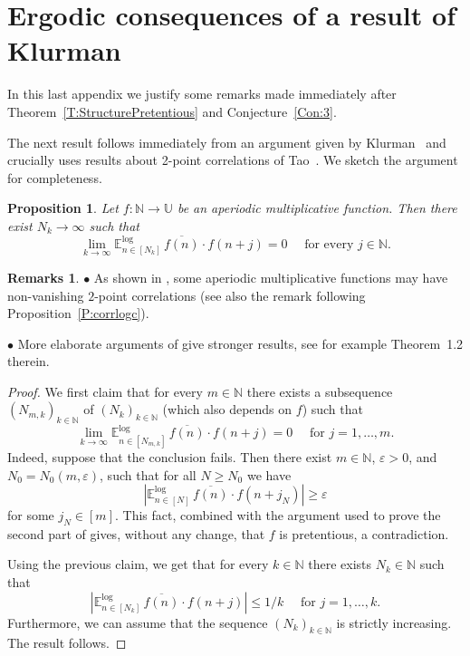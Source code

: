 \documentclass[11pt]{amsart}
\newtheorem{proposition}[lemma]{Proposition}
\theoremstyle{definition}
\newtheorem*{remarks}{Remarks}
\newcommand{\lE}{\mathbb{E}^{\log}}
\newcommand{\N}{{\mathbb N}}
\newcommand{\U}{{\mathbb U}}
\begin{document}
\section{Ergodic consequences of a result of Klurman}\label{A:Klurman}
In this last  appendix we justify some remarks made immediately after Theorem~\ref{T:StructurePretentious} and Conjecture~\ref{Con:3}.

 The next  result
follows immediately from an argument given by Klurman~ \cite{Kl17}
and  crucially uses results  about 2-point correlations of  Tao~\cite{Tao15}. We sketch the argument for completeness.
\begin{proposition}{\cite[Proof of Lemma~4.3]{Kl17}}\label{P:Klurman}
	Let $f\colon \N\to \U$ be an aperiodic multiplicative function. Then  there exist
$N_k\to\infty$ such that
\begin{equation}\label{E:Klurman}
	\lim_{k\to \infty} \lE_{n\in [N_{k}]} \, \overline{f(n)}\cdot f(n+j)=0 \quad \text{ for every } j\in \N.
\end{equation}
\end{proposition}
\begin{remarks}
		$\bullet$
	As shown in \cite[Theorem~B.1]{MRT15},  some aperiodic multiplicative functions may have non-vanishing $2$-point correlations (see also the remark following Proposition~\ref{P:corrlogc}).
	
		$\bullet$ More elaborate arguments of \cite{KMT23}  give stronger results, see for example  Theorem~1.2 therein.
\end{remarks}
\begin{proof}
	We first claim that  for every $m\in \N$ there exists
	a subsequence $(N_{m,k})_{k\in\N}$  of $(N_k)_{k\in\N}$ (which also depends on $f$) such that
	$$
	\lim_{k\to \infty} \lE_{n\in [N_{m,k}]} \, \overline{f(n)}\cdot f(n+j)=0 \quad \text{ for } j=1,\ldots, m.
	$$ 	
	Indeed, 		suppose that the conclusion fails. Then there exist $m\in \N$,  $\varepsilon>0$, and $N_0=N_0(m,\varepsilon)$,  such that for all  $N\geq N_0$  we have
	$$
	|\lE_{n\in [N]} \, \overline{f(n)}\cdot f(n+j_N)|\geq \varepsilon
	$$
	for some $j_N\in [m]$. This fact, combined with the argument used to prove the second part of \cite[Lemma~4.3]{Kl17}
	gives, without any change, that $f$ is pretentious, a contradiction.
	
	Using the previous claim, we get  that for every $k\in \N$ there exists $N_k\in \N$
	such that
	$$
		|\lE_{n\in [N_k]} \, \overline{f(n)}\cdot f(n+j)|\leq 1/k \quad \text{ for } j=1,\ldots, k.
$$
	Furthermore, we can assume that the sequence $(N_k)_{k\in \N}$ is strictly increasing.  The result follows.
\end{proof}
\end{document}
